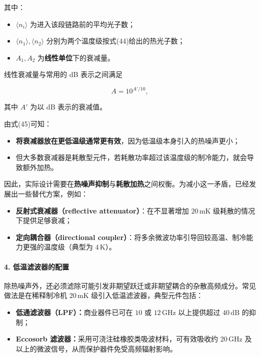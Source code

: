 \documentclass[12pt,a4paper,oneside]{ctexbook}
\begin{document}
其中：

\begin{itemize}
    \item $\langle n_i \rangle$ 为进入该段链路前的平均光子数；
    \item $\langle n_1 \rangle,\langle n_2 \rangle$ 分别为两个温度级按式(44)给出的热光子数；
    \item $A_1,A_2$ 为\textbf{线性单位}下的衰减量。
\end{itemize}

线性衰减量与常用的 dB 表示之间满足

\[
A = 10^{A'/10},
\]

其中 $A'$ 为以 dB 表示的衰减值。

由式(45)可知：

\begin{itemize}
    \item \textbf{将衰减器放在更低温级通常更有效}，因为低温级本身引入的热噪声更小；
    \item 但大多数衰减器是耗散型元件，若耗散功率超过该温度级的制冷能力，就会导致额外加热。
\end{itemize}

因此，实际设计需要在\textbf{热噪声抑制}与\textbf{耗散加热}之间权衡。为减小这一矛盾，已经发展出一些替代方案，例如：

\begin{itemize}
    \item \textbf{反射式衰减器（reflective attenuator）}：在不显著增加 $20\,\mathrm{mK}$ 级耗散的情况下提供足够衰减；
    \item \textbf{定向耦合器（directional coupler）}：将多余微波功率引导回较高温、制冷能力更强的温度级（典型为 $4\,\mathrm{K}$）。
\end{itemize}

\paragraph{4. 低温滤波器的配置}

除热噪声外，还必须滤除可能引发非期望跃迁或非期望耦合的杂散高频成分。常见做法是在稀释制冷机 $20\,\mathrm{mK}$ 级引入低温滤波器，典型元件包括：

\begin{itemize}
    \item \textbf{低通滤波器（LPF）：}商业器件已可在 $10$ 或 $12\,\mathrm{GHz}$ 以上提供超过 $40\,\mathrm{dB}$ 的抑制；
    \item \textbf{Eccosorb 滤波器：}采用可浇注硅橡胶类吸波材料，可有效吸收约 $20\,\mathrm{GHz}$ 及以上的微波信号，从而保护器件免受高频辐射影响。
\end{itemize}
\end{document}
